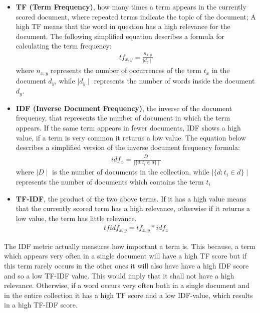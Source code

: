\begin{itemize}
\item \textbf{TF (Term Frequency)}, \ie how many times a term appears in the currently scored document, where repeated terms indicate the topic of the document; A high TF means that the word in question has a high relevance for the document. The following simplified equation \cite{tfidf} describes a formula for calculating the term frequency:
\begin{align*}
tf_{x,y} = \frac{n_{x,y}}{\mid d_{y} \mid}
\end{align*}
where $n_{x,y}$ represents the number of occurrences of the term $t_x$ in the document $d_{y}$, while $\mid d_{y} \mid$ represents the number of words inside the document $d_{y}$.

\item \textbf{IDF (Inverse Document Frequency)}, \ie the inverse of the document frequency, that represents the number of document in which the term appears. If the same term appears in fewer documents, IDF shows a high value, if a term is very common it returns a low value. 
The equation \cite{tfidf} below describes a simplified version of the inverse document frequency formula: 
\begin{align*}
idf_{x} = \frac{\mid D \mid}{\mid \{d: t_{i} \in d\} \mid}
\end{align*}
where $\mid D \mid$ is the number of documents in the collection, while $\mid \{d: t_{i} \in d\} \mid$ represents the number of documents which contains the term $t_i$

\item \textbf{TF-IDF}, \ie the product of the two above terms. If it has a high value means that the currently scored term has a high relevance, otherwise if it returns a low value, the term has little relevance.
\begin{align*}
tfidf_{x,y} = tf_{x,y}*idf_{x}
\end{align*}

\end{itemize}
The IDF metric actually measures how important a term is. This because, a term which appears very often in a single document will have a high TF score but if this term rarely occurs in the other ones it will also have have a high IDF score and so a low TF-IDF value. This would imply that it shall not have a high relevance. Otherwise, if a word occurs very often both in a single document and in the entire collection it has a high TF score and a low IDF-value, which results in a high TF-IDF score.

